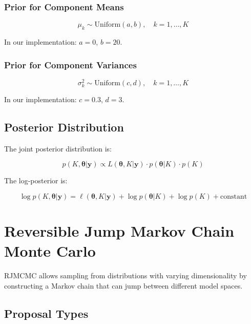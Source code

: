 \documentclass[12pt]{article}
\begin{document}
\subsubsection{Prior for Component Means}

\begin{equation}
\mu_k \sim \text{Uniform}(a, b), \quad k = 1, \ldots, K
\end{equation}

In our implementation: $a = 0$, $b = 20$.

\subsubsection{Prior for Component Variances}

\begin{equation}
\sigma_k^2 \sim \text{Uniform}(c, d), \quad k = 1, \ldots, K
\end{equation}

In our implementation: $c = 0.3$, $d = 3$.

\subsection{Posterior Distribution}

The joint posterior distribution is:

\begin{equation}
p(K, \boldsymbol{\theta}|\mathbf{y}) \propto L(\boldsymbol{\theta}, K|\mathbf{y}) \cdot p(\boldsymbol{\theta}|K) \cdot p(K)
\end{equation}

The log-posterior is:

\begin{equation}
\log p(K, \boldsymbol{\theta}|\mathbf{y}) = \ell(\boldsymbol{\theta}, K|\mathbf{y}) + \log p(\boldsymbol{\theta}|K) + \log p(K) + \text{constant}
\end{equation}

\section{Reversible Jump Markov Chain Monte Carlo}

RJMCMC allows sampling from distributions with varying dimensionality by constructing a Markov chain that can jump between different model spaces.

\subsection{Proposal Types}
\end{document}
